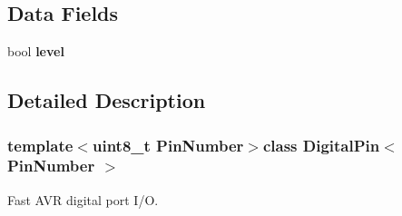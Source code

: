 \subsection*{Data Fields}
\begin{DoxyCompactItemize}
\item 
bool {\bfseries level}
\end{DoxyCompactItemize}


\subsection{Detailed Description}
\subsubsection*{template$<$uint8\-\_\-t Pin\-Number$>$class Digital\-Pin$<$ Pin\-Number $>$}

Fast A\-V\-R digital port I/\-O. 

